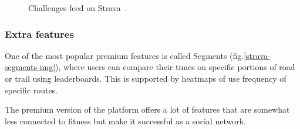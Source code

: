 \begin{figure}[h]
    \centering
    \caption{Challenges feed on Strava~\cite{strava-challenges}.}
    \label{strava-challenges}
\end{figure}

\subsubsection*{Extra features}
One of the most popular premium features is called Segments (fig.\ref{strava-segments-img}), where users can compare their times on specific portions of road or trail using leaderboards.
This is supported by heatmaps of use frequency of specific routes.

The premium version of the platform offers a lot of features that are somewhat less connected to fitness but make it successful as a social network.

